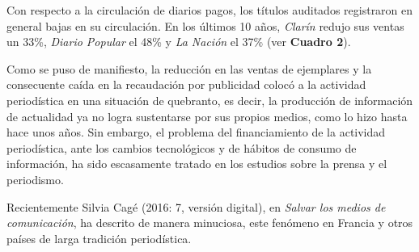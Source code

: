
Con respecto a la circulación de diarios pagos, los títulos auditados registraron en general bajas en su circulación. En los últimos 10 años, \emph{Clarín} redujo sus ventas un 33\%, \emph{Diario Popular} el 48\% y \emph{La Nación} el 37\% (ver \textbf{Cuadro 2}).

Como se puso de manifiesto, la reducción en las ventas de ejemplares y la consecuente caída en la recaudación por publicidad colocó a la actividad periodística en una situación de quebranto, es decir, la producción de información de actualidad ya no logra sustentarse por sus propios medios, como lo hizo hasta hace unos años. Sin embargo, el problema del financiamiento de la actividad periodística, ante los cambios tecnológicos y de hábitos de consumo de información, ha sido escasamente tratado en los estudios sobre la prensa y el periodismo.

Recientemente Silvia Cagé (2016: 7, versión digital), en \emph{Salvar los medios de comunicación}, ha descrito de manera minuciosa, este fenómeno en Francia y otros países de larga tradición periodística.


